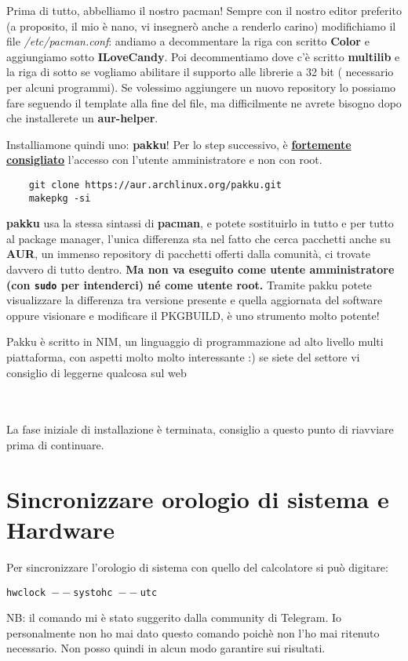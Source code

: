 \documentclass[twoside,italian]{book}
\newcommand{\nlinea}{
	\leavevmode
	\\
}
\newcommand{\centcode}[1]{
	
	\definecolor{centcode}{rgb}{0.5,0.1,0.1}
	
	\begin{center}
	 	\texttt{\textcolor{centcode}{#1}}
	\end{center}
	
	
}
\newcommand{\code}[1]{
	\texttt{\textcolor{code}{#1}}
}
\begin{document}
			Prima di tutto, abbelliamo il nostro pacman!
			Sempre con il nostro editor preferito (a proposito, il mio è nano, vi insegnerò anche a renderlo carino) modifichiamo il file \textit{/etc/pacman.conf}: andiamo a decommentare la riga con scritto \textbf{Color} e aggiungiamo sotto \textbf{ILoveCandy}.
			Poi decommentiamo dove c'è scritto \textbf{multilib} e la riga di sotto se vogliamo abilitare il supporto alle librerie a 32 bit ( necessario per alcuni programmi).
			Se volessimo aggiungere un nuovo repository lo possiamo fare seguendo il template alla fine del file, ma difficilmente ne avrete bisogno dopo che installerete un \textbf{aur-helper}.

			Installiamone quindi uno: \textbf{pakku}!
			Per lo step successivo, è \underline{\textbf{fortemente consigliato}} l'accesso con l'utente amministratore e non con root.

\begin{lstlisting}
	git clone https://aur.archlinux.org/pakku.git
	makepkg -si
\end{lstlisting}

			\textbf{pakku} usa la stessa sintassi di \textbf{pacman}, e potete sostituirlo in tutto e per tutto al package manager, l'unica differenza sta nel fatto che cerca pacchetti anche su \textbf{AUR}, un immenso repository di pacchetti offerti dalla comunità, ci trovate davvero di tutto dentro. \textbf{Ma non va eseguito come utente amministratore (con \code{sudo} per intenderci) né come utente root.}
			Tramite pakku potete visualizzare la differenza tra versione presente e quella aggiornata del software oppure visionare e modificare il PKGBUILD, è uno strumento molto potente!
			
			Pakku è scritto in NIM, un linguaggio di programmazione ad alto livello multi piattaforma, con aspetti molto molto interessante :) se siete del settore vi consiglio di leggerne qualcosa sul web
\nlinea
	\nlinea
			La fase iniziale di installazione è terminata, consiglio a questo punto di riavviare prima di continuare.
			
			
		\section{Sincronizzare orologio di sistema e Hardware}
			
			Per sincronizzare l'orologio di sistema con quello del calcolatore si può digitare:\centcode{hwclock $--$systohc $--$utc}
			
			\begin{tcolorbox}[floatplacement=b,width=\textwidth,colback={blue},title={NOTA BENE:},colbacktitle=gray,coltitle=white,colupper=white]
				NB: il comando mi è stato suggerito dalla community di Telegram. Io personalmente non ho mai dato questo comando poichè non l'ho mai ritenuto necessario. Non posso quindi in alcun modo garantire sui risultati.				
			\end{tcolorbox}
			
\end{document}
